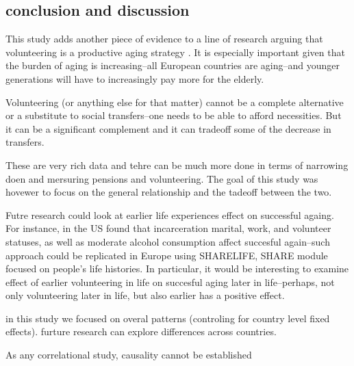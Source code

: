 \documentclass[10pt, letterpaper]{article}
\begin{document}
\begin{spacing}{1.4}
\section{conclusion and discussion}

This study adds another piece of evidence to a line of research arguing that
volunteering is a productive aging strategy \citep[e.g.,][]{wilson12B,hank09}.
It is especially important given that the burden of aging %
 is increasing--all European countries are aging--and younger generations will
 have to increasingly pay more for the elderly.

Volunteering (or anything else for that matter) cannot be a complete alternative
or a substitute to social transfers--one needs to be able to afford necessities.
But it can be a significant complement and
it can tradeoff some of the decrease in transfers.

These are very rich data and tehre can be much more done in terms of narrowing
doen and mersuring pensions and volunteering. The goal of this study was hovewer
to focus on the general relationship and the tadeoff between the two.

Futre research could look at earlier life experiences effect on successful
againg. For instance, in the US \citet{pruchno10} found that incarceration
 marital, work, and volunteer statuses, as well as moderate
alcohol consumption affect succesful again--such approach could be
replicated in Europe using SHARELIFE, SHARE module focused on people's life
histories. In particular, it would be interesting to examine effect of earlier
volunteering in life on succesful aging later in life--perhaps, not only
volunteering later in life, but also earlier has a positive effect. 


in this study we focused on overal patterns (controling for country level fixed
effects). furture research can explore differences across countries. 

As any correlational study, causality cannot be established




\end{spacing}
\end{document}
